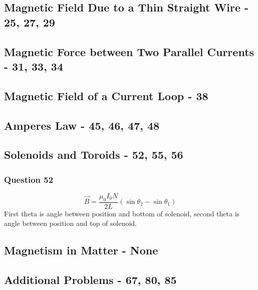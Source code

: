 \documentclass[12pt, letterpaper, twoside]{article}
\begin{document}
  \subsection{Magnetic Field Due to a Thin Straight Wire - 25, 27, 29}

  \subsection{Magnetic Force between Two Parallel Currents - 31, 33, 34}
  
  \subsection{Magnetic Field of a Current Loop - 38}
  
  \subsection{Amperes Law - 45, 46, 47, 48}
  
  \subsection{Solenoids and Toroids - 52, 55, 56}
    \subsubsection*{Question 52}
	  $$\vec{B} = \frac{\mu_0I_0N}{2L}(\sin \theta_2 - \sin \theta_1)$$
	  First theta is angle between position and bottom of solenoid, second theta is angle between position and top of solenoid.
      
  
  \subsection{Magnetism in Matter - None}
  
  \subsection*{Additional Problems - 67, 80, 85}
\end{document}
